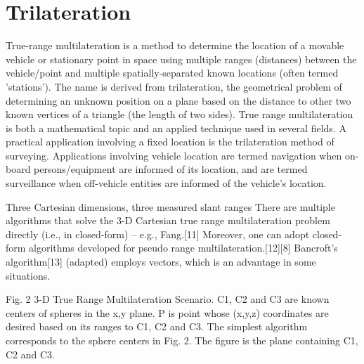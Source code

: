 \documentclass[\main/main.tex]{subfiles}
\begin{document}

\section{Trilateration}
True-range multilateration is a method to determine the location of a movable vehicle or stationary point in space using multiple ranges (distances) between the vehicle/point and multiple spatially-separated known locations (often termed 'stations'). The name is derived from trilateration, the geometrical problem of determining an unknown position on a plane based on the distance to other two known vertices of a triangle (the length of two sides). True range multilateration is both a mathematical topic and an applied technique used in several fields. A practical application involving a fixed location is the trilateration method of surveying. Applications involving vehicle location are termed navigation when on-board persons/equipment are informed of its location, and are termed surveillance when off-vehicle entities are informed of the vehicle's location.

Three Cartesian dimensions, three measured slant ranges
There are multiple algorithms that solve the 3-D Cartesian true range multilateration problem directly (i.e., in closed-form) – e.g., Fang.[11] Moreover, one can adopt closed-form algorithms developed for pseudo range multilateration.[12][8] Bancroft's algorithm[13] (adapted) employs vectors, which is an advantage in some situations.


Fig. 2 3-D True Range Multilateration Scenario. C1, C2 and C3 are known centers of spheres in the x,y plane. P is point whose (x,y,z) coordinates are desired based on its ranges to C1, C2 and C3.
The simplest algorithm corresponds to the sphere centers in Fig. 2. The figure  is the plane containing C1, C2 and C3. 
\end{document}
